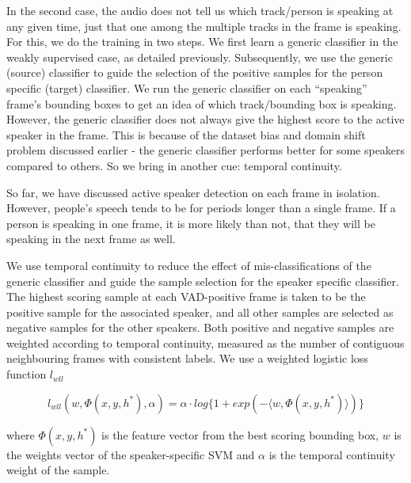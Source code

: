 \documentclass[runningheads]{llncs}
\begin{document}
In the second case, the audio does not tell us which track/person is speaking at any given time, just that one among the multiple tracks in the frame is speaking. 
%
For this, we do the training in two steps. We first learn a generic classifier in the weakly supervised case, as detailed previously. Subsequently, we use the generic (source) classifier to guide the selection of the positive samples for the person specific (target) classifier. We run the generic classifier on each ``speaking'' frame's bounding boxes to get an idea of which track/bounding box is speaking.
%
However, the generic classifier does not always give the highest score to the active speaker in the frame. This is because of the dataset bias and domain shift problem discussed earlier - the generic classifier performs better for some speakers compared to others. So we bring in another cue: temporal continuity.

So far, we have discussed active speaker detection on each frame in isolation. However, people's speech tends to be for periods longer than a single frame. If a person is speaking in one frame, it is more likely than not, that they will be speaking in the next frame as well. 

We use temporal continuity to reduce the effect of mis-classifications of the generic classifier and guide the sample selection for the speaker specific classifier. 
The highest scoring sample at each VAD-positive frame is taken to be the positive sample for the associated speaker, and all other samples are selected as negative samples for the other speakers. Both positive and negative samples are weighted according to temporal continuity, measured as the number of contiguous neighbouring frames with consistent labels.
%
We use a weighted logistic loss function $l_{wll}$

\begin{dmath}
l_{wll}(w,\Phi(x,y,h^*),\alpha) = \alpha \cdot log\lbrace1+exp(-\langle w,\Phi(x,y,h^*) \rangle )\rbrace
\label{eq:weightedLogLoss}
\end{dmath}

where $\Phi(x,y,h^*)$ is the feature vector from the best scoring bounding box, $w$ is the weights vector of the speaker-specific SVM and $\alpha$ is the temporal continuity weight of the sample.
\end{document}
